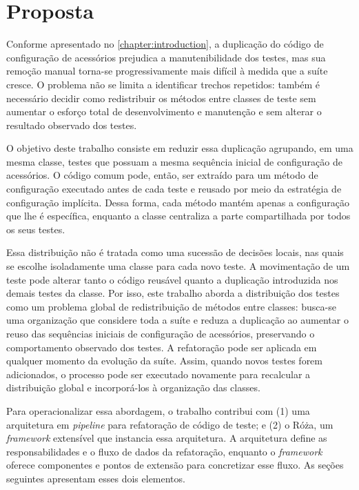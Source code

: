 \chapter{Proposta}
\label{chapter:proposal}

Conforme apresentado no \autoref{chapter:introduction}, a duplicação do código de configuração de acessórios prejudica a manutenibilidade dos testes, mas sua remoção manual torna-se progressivamente mais difícil à medida que a suíte cresce. O problema não se limita a identificar trechos repetidos: também é necessário decidir como redistribuir os métodos entre classes de teste sem aumentar o esforço total de desenvolvimento e manutenção e sem alterar o resultado observado dos testes.

O objetivo deste trabalho consiste em reduzir essa duplicação agrupando, em uma mesma classe, testes que possuam a mesma sequência inicial de configuração de acessórios. O código comum pode, então, ser extraído para um método de configuração executado antes de cada teste e reusado por meio da estratégia de configuração implícita. Dessa forma, cada método mantém apenas a configuração que lhe é específica, enquanto a classe centraliza a parte compartilhada por todos os seus testes.

Essa distribuição não é tratada como uma sucessão de decisões locais, nas quais se escolhe isoladamente uma classe para cada novo teste. A movimentação de um teste pode alterar tanto o código reusável quanto a duplicação introduzida nos demais testes da classe. Por isso, este trabalho aborda a distribuição dos testes como um problema global de redistribuição de métodos entre classes: busca-se uma organização que considere toda a suíte e reduza a duplicação ao aumentar o reuso das sequências iniciais de configuração de acessórios, preservando o comportamento observado dos testes. A refatoração pode ser aplicada em qualquer momento da evolução da suíte. Assim, quando novos testes forem adicionados, o processo pode ser executado novamente para recalcular a distribuição global e incorporá-los à organização das classes.

Para operacionalizar essa abordagem, o trabalho contribui com (1) uma arquitetura em \textit{pipeline} para refatoração de código de teste; e (2) o Róża, um \textit{framework} extensível que instancia essa arquitetura. A arquitetura define as responsabilidades e o fluxo de dados da refatoração, enquanto o \textit{framework} oferece componentes e pontos de extensão para concretizar esse fluxo. As seções seguintes apresentam esses dois elementos.

